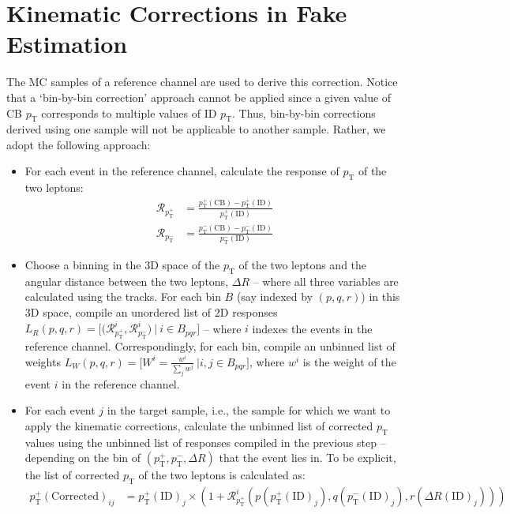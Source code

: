 \section{Kinematic Corrections in Fake Estimation}
\label{sec:kinematic-corrections}
The MC samples of a reference channel are used to derive this correction. %
Notice that a `bin-by-bin correction' approach cannot be applied since a given value of CB $p_{\text{T}}$ corresponds to multiple values of ID $p_{\text{T}}$. %
Thus, bin-by-bin corrections derived using one sample will not be applicable to another sample. %
Rather, we adopt the following approach:
\begin{itemize}
    \item For each event in the reference channel, calculate the response of $p_{\text{T}}$ of the two leptons:
    \begin{align}
        \mathcal{R}_{p^+_{\text{T}}} &= \frac{p^+_{\text{T}}({\text{CB}}) - p^+_{\text{T}}({\text{ID}})}{p^+_{\text{T}}({\text{ID}})}\\
        \mathcal{R}_{p^-_{\text{T}}} &= \frac{p^-_{\text{T}}({\text{CB}}) - p^-_{\text{T}}({\text{ID}})}{p^-_{\text{T}}({\text{ID}})}
    \end{align}
    \item Choose a binning in the $3{\text{D}}$ space of the $p_{\text{T}}$ of the two leptons and the angular distance between the two leptons, $\Delta R$ -- where all three variables are calculated using the {} tracks. For each bin $B$ (say indexed by $(p,q,r)$) in this $3{\text{D}}$ space, compile an unordered list of $2{\text{D}}$ responses $L_R(p,q,r) = \big[\big(\mathcal{R}^{i}_{p^+_{\text{T}}}, \mathcal{R}^{i}_{p^-_{\text{T}}}\big)\ \big\vert\  i\in B_{pqr}\big]$ -- where $i$ indexes the events in the reference channel. Correspondingly, for each bin, compile an unbinned list of weights $L_W(p,q,r)=\big[W^i=\frac{w^i}{\sum_j w^j}\ \big\vert i,j\in B_{pqr}\big]$, where $w^i$ is the weight of the event $i$ in the reference channel. 
    \item For each event $j$ in the target sample, i.e., the sample for which we want to apply the kinematic corrections, calculate the unbinned list of corrected $p_{\text{T}}$ values using the unbinned list of responses compiled in the previous step -- depending on the bin of $(p^+_{\text{T}}, p^-_{\text{T}}, \Delta R)$ that the event lies in. To be explicit, the list of corrected $p_{\text{T}}$ of the two leptons is calculated as:
    \begin{align}
        p^+_{\text{T}}({\text{Corrected}})_{ij} &= p^+_{\text{T}}({\text{ID}})_j \times (1 + \mathcal{R}^{i}_{p^+_{\text{T}}}(p(p^+_{\text{T}}({\text{ID}})_j),q(p^-_{\text{T}}({\text{ID}})_j),r(\Delta R({\text{ID}})_j)))\\

\end{align}
\end{itemize}
